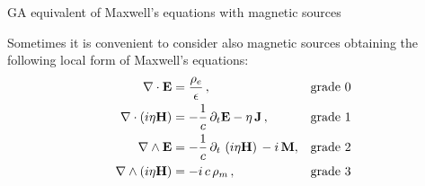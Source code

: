 \documentclass[handout,10pt]{beamer}
\begin{document}
\begin{frame}[fragile]{GA equivalent of Maxwell's equations with magnetic sources}

Sometimes it is convenient to consider also magnetic sources 
obtaining the following local form of Maxwell's equations:
\begin{subequations}
\begin{align}
\nabla \cdot \mathbf{E} &=  \frac{\rho_e}{\epsilon}  \, , &&\text{grade 0} \label{GausseGA} \\
\nabla \cdot \left(i \eta \mathbf{H}\right) &= - \frac{1}{c}\,  \partial_t \mathbf{E} - \eta \,\mathbf{J}  \, , &&\text{grade 1} \label{AmpereGA} \\
\nabla \wedge \mathbf{E} &= - \frac{1}{c}\,  \partial_t \, \left(i \eta \mathbf{H}\right) \, -i \, \mathbf{M} , &&\text{grade 2}  \label{FaradayGA} \\
\nabla \wedge \left(i \eta \mathbf{H}\right) &=  - i \, c \, \rho_m \, , &&\text{grade 3} \label{GaussmGA}
\end{align}
\end{subequations}

\end{frame}
\end{document}
